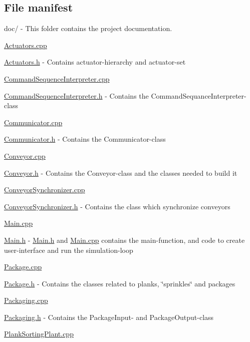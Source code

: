 \subsection*{File manifest}


\begin{DoxyItemize}
\item doc/ -\/ This folder contains the project documentation.
\item \hyperlink{Actuators_8cpp}{Actuators.\-cpp}
\item \hyperlink{Actuators_8h}{Actuators.\-h} -\/ Contains actuator-\/hierarchy and actuator-\/set
\item \hyperlink{CommandSequenceInterpreter_8cpp}{Command\-Sequence\-Interpreter.\-cpp}
\item \hyperlink{CommandSequenceInterpreter_8h}{Command\-Sequence\-Interpreter.\-h} -\/ Contains the Command\-Sequance\-Interpreter-\/class
\item \hyperlink{Communicator_8cpp}{Communicator.\-cpp}
\item \hyperlink{Communicator_8h}{Communicator.\-h} -\/ Contains the Communicator-\/class
\item \hyperlink{Conveyor_8cpp}{Conveyor.\-cpp}
\item \hyperlink{Conveyor_8h}{Conveyor.\-h} -\/ Contains the Conveyor-\/class and the classes needed to build it
\item \hyperlink{ConveyorSynchronizer_8cpp}{Conveyor\-Synchronizer.\-cpp}
\item \hyperlink{ConveyorSynchronizer_8h}{Conveyor\-Synchronizer.\-h} -\/ Contains the class which synchronize conveyors
\item \hyperlink{Main_8cpp}{Main.\-cpp}
\item \hyperlink{Main_8h}{Main.\-h} -\/ \hyperlink{Main_8h}{Main.\-h} and \hyperlink{Main_8cpp}{Main.\-cpp} contains the main-\/function, and code to create user-\/interface and run the simulation-\/loop
\item \hyperlink{Package_8cpp}{Package.\-cpp}
\item \hyperlink{Package_8h}{Package.\-h} -\/ Contains the classes related to planks, \char`\"{}sprinkles\char`\"{} and packages
\item \hyperlink{Packaging_8cpp}{Packaging.\-cpp}
\item \hyperlink{Packaging_8h}{Packaging.\-h} -\/ Contains the Package\-Input-\/ and Package\-Output-\/class
\item \hyperlink{PlankSortingPlant_8cpp}{Plank\-Sorting\-Plant.\-cpp}

\end{DoxyItemize}
